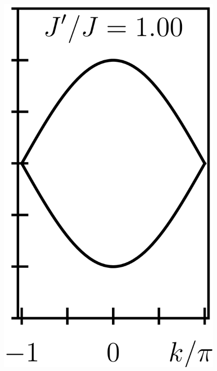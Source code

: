 \documentclass{svmono}
\begin{document}
\begin{figure}[ht]
    \includegraphics{figures/cropped_ssh_dispersion_2.png}

\end{figure}
\end{document}
